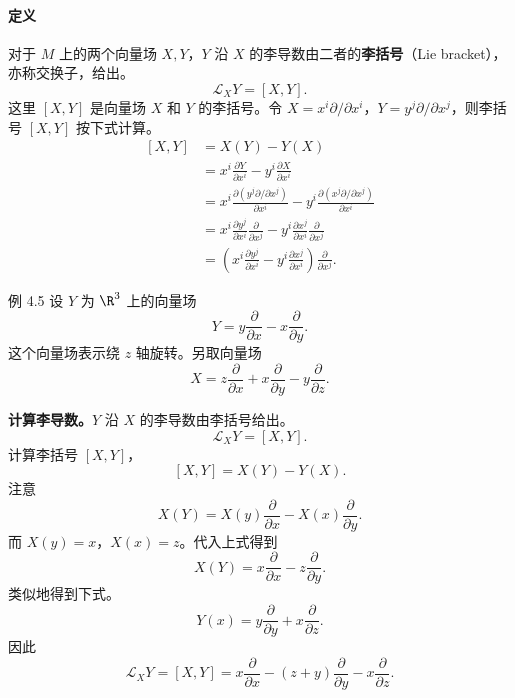 \paragraph{定义}
对于 $M$ 上的两个向量场 $X,Y$，$Y$ 沿 $X$ 的李导数由二者的\textbf{李括号}（Lie bracket），亦称交换子，给出。
\[
  \mathcal L_XY=[X,Y].
\]
这里 $[X,Y]$ 是向量场 $X$ 和 $Y$ 的李括号。令
$X=x^i\partial/\partial x^i$，$Y=y^j\partial/\partial x^j$，则李括号 $[X,Y]$ 按下式计算。
\[
  \begin{aligned}
    [X,Y]&=X(Y)-Y(X)\\
      &=x^i\frac{\partial Y}{\partial x^i}-y^i\frac{\partial X}{\partial x^i}\\
      &=x^i\frac{\partial(y^j\partial/\partial x^j)}{\partial x^i}
        -y^i\frac{\partial(x^j\partial/\partial x^j)}{\partial x^i}\\
      &=x^i\frac{\partial y^j}{\partial x^i}\frac{\partial}{\partial x^j}
        -y^i\frac{\partial x^j}{\partial x^i}\frac{\partial}{\partial x^j}\\
      &=\left(x^i\frac{\partial y^j}{\partial x^i}
              -y^i\frac{\partial x^j}{\partial x^i}\right)\frac{\partial}{\partial x^j}.
  \end{aligned}
\]

\begin{statement}{例 4.5}{}
设 $Y$ 为 $\R^3$ 上的向量场
\[
  Y=y\frac{\partial}{\partial x}-x\frac{\partial}{\partial y}.
\]
这个向量场表示绕 $z$ 轴旋转。另取向量场
\[
  X=z\frac{\partial}{\partial x}+x\frac{\partial}{\partial y}
          -y\frac{\partial}{\partial z}.
\]

\textbf{计算李导数。}$Y$ 沿 $X$ 的李导数由李括号给出。
\[
  \mathcal L_XY=[X,Y].
\]
计算李括号 $[X,Y]$，
\[
  [X,Y]=X(Y)-Y(X).
\]
注意
\[
  X(Y)=X(y)\frac{\partial}{\partial x}-X(x)\frac{\partial}{\partial y}.
\]
而 $X(y)=x$，$X(x)=z$。代入上式得到
\[
  X(Y)=x\frac{\partial}{\partial x}-z\frac{\partial}{\partial y}.
\]
类似地得到下式。
\[
  Y(x)=y\frac{\partial}{\partial y}+x\frac{\partial}{\partial z}.
\]
因此
\[
  \mathcal L_XY=[X,Y]
     =x\frac{\partial}{\partial x}-(z+y)\frac{\partial}{\partial y}
          -x\frac{\partial}{\partial z}.
\]
\end{statement}

